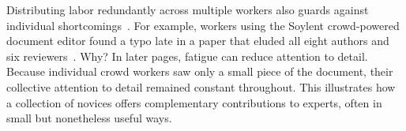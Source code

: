 Distributing labor redundantly across multiple workers also guards against individual shortcomings~\cite{Snow2008}. For example, workers using the Soylent crowd-powered document editor found a typo late in a paper that eluded all eight authors and six reviewers~\cite{Bernstein2010a}. Why? In later pages, fatigue can reduce attention to detail. Because individual crowd workers saw only a small piece of the document, their collective attention to detail remained constant throughout. This illustrates how a collection of novices offers complementary contributions to experts, often in small but nonetheless useful ways. 



